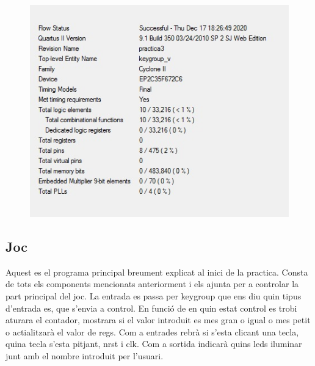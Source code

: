 \documentclass[12pt, a4papre]{article}
\begin{document}
	
			\begin{figure}[H]
		\begin{center}
		\includegraphics[width=130mm]{informeKeygroup.jpeg}
		\end{center}
	\end{figure}	
	
	
	\subsection{Joc}
	Aquest es el programa principal breument explicat al inici de la practica. Consta de tots els components mencionats anteriorment i els ajunta per a controlar la part principal del joc. La entrada es passa per keygroup que ens diu quin tipus d'entrada es, que s'envia a control. En funció de en quin estat control es trobi aturara el contador, mostrara si el valor introduit es mes gran o igual o mes petit o actialitzarà el valor de regs. Com a entrades rebrà si s'esta clicant una tecla, quina tecla s'esta pitjant, nrst i clk. Com a sortida indicarà quins leds iluminar junt amb el nombre introduit per l'usuari.
	
\end{document}

